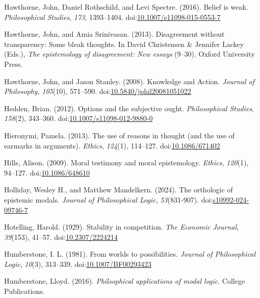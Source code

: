 \documentclass[
  10pt,
  letterpaper,
  twoside]{scrbook}
\newlength{\cslhangindent}
\newenvironment{CSLReferences}[2] %
 {\begin{list}{}{%
  \setlength{\itemindent}{0pt}
  \setlength{\leftmargin}{0pt}
  \setlength{\parsep}{0pt}
  \ifodd #1
   \setlength{\leftmargin}{\cslhangindent}
   \setlength{\itemindent}{-1\cslhangindent}
  \fi
  \setlength{\itemsep}{#2\baselineskip}}}
 {\end{list}}
\begin{document}
\begin{CSLReferences}{1}{0}
Hawthorne, John, Daniel Rothschild, and Levi Spectre. (2016). Belief is
weak. \emph{Philosophical Studies}, \emph{173}, 1393--1404.
doi:\href{https://doi.org/10.1007/s11098-015-0553-7}{10.1007/s11098-015-0553-7}

Hawthorne, John, and Amia Srinivasan. (2013). Disagreement without
transparency: Some bleak thoughts. In David Christensen \& Jennifer
Lackey (Eds.), \emph{The epistemology of disagreement: New essays}
(9--30). Oxford University Press.

Hawthorne, John, and Jason Stanley. (2008). {Knowledge and Action}.
\emph{Journal of Philosophy}, \emph{105}(10), 571--590.
doi:\href{https://doi.org/10.5840/jphil20081051022}{10.5840/jphil20081051022}

Hedden, Brian. (2012). Options and the subjective ought.
\emph{Philosophical Studies}, \emph{158}(2), 343--360.
doi:\href{https://doi.org/10.1007/s11098-012-9880-0}{10.1007/s11098-012-9880-0}

Hieronymi, Pamela. (2013). The use of reasons in thought (and the use of
earmarks in arguments). \emph{Ethics}, \emph{124}(1), 114--127.
doi:\href{https://doi.org/10.1086/671402}{10.1086/671402}

Hills, Alison. (2009). Moral testimony and moral epistemology.
\emph{Ethics}, \emph{120}(1), 94--127.
doi:\href{https://doi.org/10.1086/648610}{10.1086/648610}

Holliday, Wesley H., and Matthew Mandelkern. (2024). The orthologic of
epistemic modals. \emph{Journal of Philosophical Logic},
\emph{53}(831-907).
doi:\href{https://doi.org/s10992-024-09746-7}{s10992-024-09746-7}

Hotelling, Harold. (1929). Stability in competition. \emph{The Economic
Journal}, \emph{39}(153), 41--57.
doi:\href{https://doi.org/10.2307/2224214}{10.2307/2224214}

Humberstone, I. L. (1981). From worlds to possibilities. \emph{Journal
of Philosophical Logic}, \emph{10}(3), 313--339.
doi:\href{https://doi.org/10.1007/BF00293423}{10.1007/BF00293423}

Humberstone, Lloyd. (2016). \emph{Philsophical applications of modal
logic}. College Publications.


\end{CSLReferences}
\end{document}
